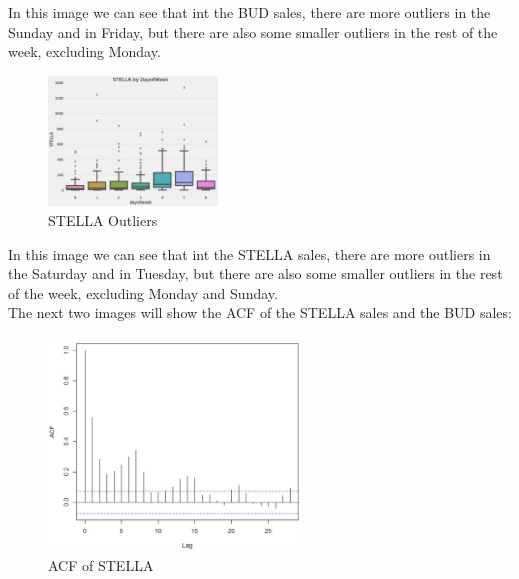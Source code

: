     In this image we can see that int the BUD sales, there are more outliers in the Sunday and in Friday, but there are also some smaller outliers in the rest of the week, excluding Monday. \\


\begin{figure}[H]
    \centering
    \includegraphics[width=0.4\textwidth]{assets/stella-outliers.jpeg}
    \caption{STELLA Outliers}
    \label{fig:stella_outliers}
    \end{figure}


In this image we can see that int the STELLA sales, there are more outliers in the Saturday and in Tuesday, but there are also some smaller outliers in the rest of the week, excluding Monday and Sunday. \\


The next two images will show the ACF of the STELLA sales and the BUD sales:


    \begin{figure}[H]
        \centering
        \includegraphics[width=0.6\textwidth]{assets/ACF STELLA.jpeg}
        \caption{ACF of STELLA}
        \label{fig:stella_outliers}
        \end{figure}


